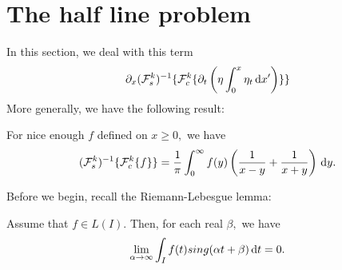 \documentclass[10pt,reqno,oneside,a4paper]{article}
\begin{document}
\section{The half line problem}
In this section, we deal with this term 
\[ 
\partial_x(\mathcal{F}^k_s)^{-1} \{ \mathcal{F}^k_c \{ \partial_t \left( \eta \int^{x}_0\eta_{t} \,\mathrm{d} x' \right)\} \}
\]
More generally, we have the following result:
\begin{thm}
For nice enough $f$ defined on $x\geq 0,$ we have
\[ 
(\mathcal{F}^k_s)^{-1} \{ \mathcal{F}^k_c \{ f \} \} = \frac{1}{\pi} \int^{\infty}_0 f(y) \left( \frac{1}{x-y} + \frac{1}{x+y} \right) \,\mathrm{d} y.
\]
\end{thm}
Before we begin, recall the Riemann-Lebesgue lemma:
\begin{lem}
Assume that $f \in L(I).$ Then, for each real $\beta,$ we have 
\[\lim_{\alpha\to\infty} \int_I f(t) sing(\alpha t + \beta) \,\mathrm{d} t = 0.\]
\end{lem}
\end{document}
